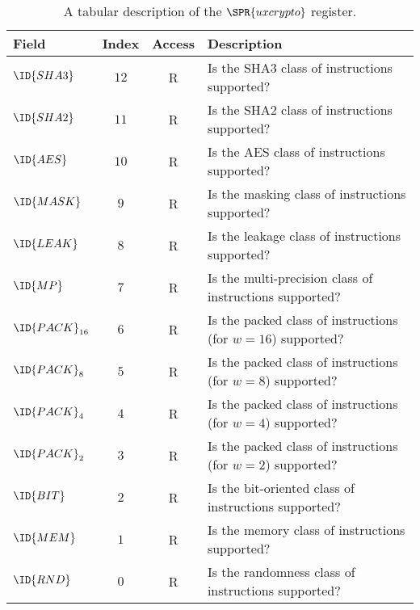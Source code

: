 \begin{table}[p]
\begin{center}
\begin{tabular}{|l|c|c|l|}
\hline
Field            & Index           & Access & Description                                                            \\ 
\hline
$\ID{SHA3}     $ & $           12$ & R      & Is the SHA3            class of instructions                supported? \\
$\ID{SHA2}     $ & $           11$ & R      & Is the SHA2            class of instructions                supported? \\
$\ID{AES }     $ & $           10$ & R      & Is the AES             class of instructions                supported? \\
$\ID{MASK}     $ & $            9$ & R      & Is the masking         class of instructions                supported? \\
$\ID{LEAK}     $ & $            8$ & R      & Is the leakage         class of instructions                supported? \\
$\ID{MP  }     $ & $            7$ & R      & Is the multi-precision class of instructions                supported? \\
$\ID{PACK}_{16}$ & $            6$ & R      & Is the packed          class of instructions (for $w = 16$) supported? \\
$\ID{PACK}_{8} $ & $            5$ & R      & Is the packed          class of instructions (for $w =  8$) supported? \\
$\ID{PACK}_{4} $ & $            4$ & R      & Is the packed          class of instructions (for $w =  4$) supported? \\
$\ID{PACK}_{2} $ & $            3$ & R      & Is the packed          class of instructions (for $w =  2$) supported? \\
$\ID{BIT }     $ & $            2$ & R      & Is the bit-oriented    class of instructions                supported? \\
$\ID{MEM }     $ & $            1$ & R      & Is the memory          class of instructions                supported? \\
$\ID{RND }     $ & $            0$ & R      & Is the randomness      class of instructions                supported? \\
\hline
\end{tabular}
\end{center}
\caption{A tabular      description of the $\SPR{uxcrypto}$ register.}
\label{tab:csr:uxcrypto}
\end{table}

